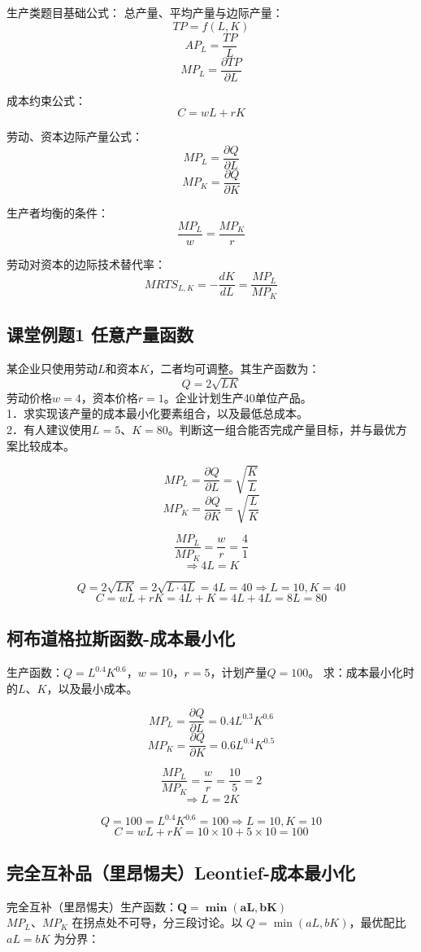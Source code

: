 \documentclass[cn,hazy,blue,14pt,screen]{elegantnote}
\begin{document}
生产类题目基础公式：
总产量、平均产量与边际产量：
$$ TP = f(L,K)$$
$$ AP_L = \frac{TP}{L}$$
$$ MP_L = \frac{\partial TP}{\partial L}$$

成本约束公式：
$$ C = wL + rK$$

劳动、资本边际产量公式：
$$ MP_L = \frac{\partial Q}{\partial L}$$
$$ MP_K = \frac{\partial Q}{\partial K}$$

生产者均衡的条件：
$$\frac{MP_L}{w} = \frac{MP_K}{r}$$

劳动对资本的边际技术替代率：
$$ MRTS_{L,K} = -\frac{dK}{dL} = \frac{MP_L}{MP_K}$$

\subsection{课堂例题1 任意产量函数}

某企业只使用劳动$L$和资本$K$，二者均可调整。其生产函数为：
$$ Q = 2\sqrt{LK}$$
劳动价格$w=4$，资本价格$r=1$。企业计划生产40单位产品。\\
1．求实现该产量的成本最小化要素组合，以及最低总成本。\\
2．有人建议使用$L=5$、$K=80$。判断这一组合能否完成产量目标，并与最优方案比较成本。

$$ MP_L = \frac{\partial Q}{\partial L} = \sqrt{\frac{K}{L}}$$
$$ MP_K = \frac{\partial Q}{\partial K} = \sqrt{\frac{L}{K}}$$

$$ \frac{MP_L}{MP_K} = \frac{w}{r} = \frac{4}{1}$$
$$ \Rightarrow 4L = K$$

$$ Q = 2\sqrt{LK} = 2\sqrt{L \cdot 4L} = 4L = 40 \Rightarrow L=10, K=40$$
$$ C = wL + rK = 4L + K = 4L + 4L = 8L = 80$$

\subsection{柯布道格拉斯函数-成本最小化}
生产函数：$Q=L^{0.4}K^{0.6}$，$w=10$，$r=5$，计划产量$Q=100$。
求：成本最小化时的$L、K$，以及最小成本。

$$MP_L = \frac{\partial Q}{\partial L} = 0.4L^{0.3}K^{0.6}$$
$$MP_K = \frac{\partial Q}{\partial K} = 0.6L^{0.4}K^{0.5}$$

$$ \frac{MP_L}{MP_K} = \frac{w}{r} = \frac{10}{5} = 2$$
$$ \Rightarrow L = 2K$$

$$ Q = 100 = L^{0.4}K^{0.6} = 100 \Rightarrow L=10, K=10$$
$$ C = wL+rK = 10 \times 10 + 5 \times 10 = 100$$

\subsection{完全互补品（里昂惕夫）Leontief-成本最小化}
完全互补（里昂惕夫）生产函数：\(\boldsymbol{Q=\min(aL,bK)}\) \\
\(MP_L、MP_K\) 在拐点处不可导，分三段讨论。以 \(Q=\min(aL,bK)\)，最优配比 \(aL=bK\) 为分界：
\end{document}
